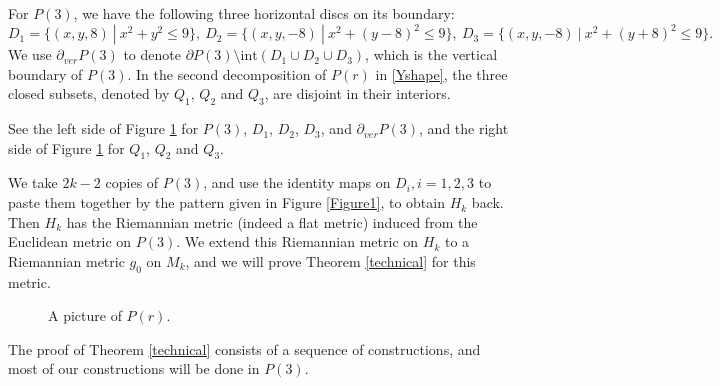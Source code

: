 \documentclass{amsart}
\begin{document}
For $P(3)$, we have the following three horizontal discs on its boundary: 
$$D_1=\{(x,y,8)\ |\ x^2+y^2\leq 9\},\ D_2=\{(x,y,-8)\ |\ x^2+(y-8)^2\leq 9\},\ D_3=\{(x,y,-8)\ |\ x^2+(y+8)^2\leq 9\}.$$ We use $\partial_{ver}P(3)$ to denote $\partial P(3)\setminus \text{int}(D_1\cup D_2\cup D_3)$, which is the vertical boundary of $P(3)$.
In the second decomposition of $P(r)$ in \eqref{Yshape}, the three closed subsets, denoted by $Q_1$, $Q_2$ and $Q_3$, are disjoint in their interiors.

See the left side of Figure \ref{Figure2} for $P(3)$, $D_1$, $D_2$, $D_3$, and $\partial_{ver}P(3)$, and the right side of Figure \ref{Figure2} for $Q_1$, $Q_2$ and $Q_3$.
  
We take $2k-2$ copies of $P(3)$, and use the identity maps on $D_i, i=1,2,3$ to paste them together by the pattern given in Figure \ref{Figure1}, to obtain $H_k$ back. Then $H_k$ has the Riemannian metric (indeed a flat metric) induced from  the Euclidean metric on $P(3)$.
We extend this Riemannian metric on $H_k$ to a Riemannian metric $g_0$ on $M_k$, and we will prove Theorem
\ref{technical} for this metric.


\begin{figure}[htbp]
    \centering
    \def\svgwidth{5in} %
  
    \caption{A picture of $P(r)$.}
     \label{Figure2}
\end{figure}







The proof of Theorem \ref{technical} consists of a sequence of constructions, and most of our constructions will be done in $P(3)$. 
\end{document}
